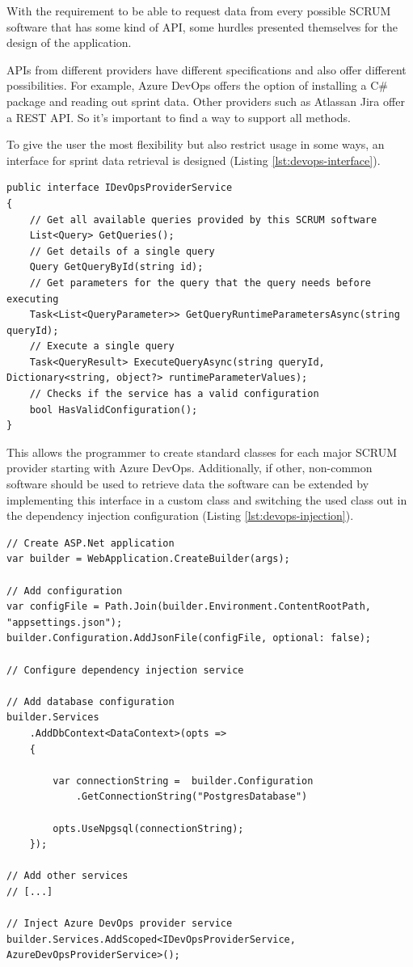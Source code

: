 With the requirement to be able to request data from every possible SCRUM software that has some kind of API, some hurdles presented themselves for the design of the application. 

APIs from different providers have different specifications and also offer different possibilities. For example, Azure DevOps offers the option of installing a C\# package and reading out sprint data. Other providers such as Atlassan Jira offer a REST API. So it's important to find a way to support all methods.

To give the user the most flexibility but also restrict usage in some ways, an interface for sprint data retrieval is designed (Listing \ref{lst:devops-interface}).

\begin{lstlisting}[style=csharp, caption=Expression base class, label=lst:devops-interface]
public interface IDevOpsProviderService
{
    // Get all available queries provided by this SCRUM software 
    List<Query> GetQueries();
    // Get details of a single query  
    Query GetQueryById(string id);
    // Get parameters for the query that the query needs before executing  
    Task<List<QueryParameter>> GetQueryRuntimeParametersAsync(string queryId);
    // Execute a single query  
    Task<QueryResult> ExecuteQueryAsync(string queryId, Dictionary<string, object?> runtimeParameterValues);
    // Checks if the service has a valid configuration  
    bool HasValidConfiguration();
}
\end{lstlisting}

This allows the programmer to create standard classes for each major SCRUM provider starting with Azure DevOps. Additionally, if other, non-common software should be used to retrieve data the software can be extended by implementing this interface in a custom class and switching the used class out in the dependency injection configuration (Listing \ref{lst:devops-injection}). 

\begin{lstlisting}[style=csharp, caption=Expression base class, label=lst:devops-injection]
// Create ASP.Net application
var builder = WebApplication.CreateBuilder(args);

// Add configuration
var configFile = Path.Join(builder.Environment.ContentRootPath, "appsettings.json");
builder.Configuration.AddJsonFile(configFile, optional: false);

// Configure dependency injection service

// Add database configuration
builder.Services
    .AddDbContext<DataContext>(opts =>
    {

        var connectionString =  builder.Configuration
            .GetConnectionString("PostgresDatabase")

        opts.UseNpgsql(connectionString);
    });

// Add other services
// [...]
 
// Inject Azure DevOps provider service
builder.Services.AddScoped<IDevOpsProviderService, AzureDevOpsProviderService>();

\end{lstlisting}

